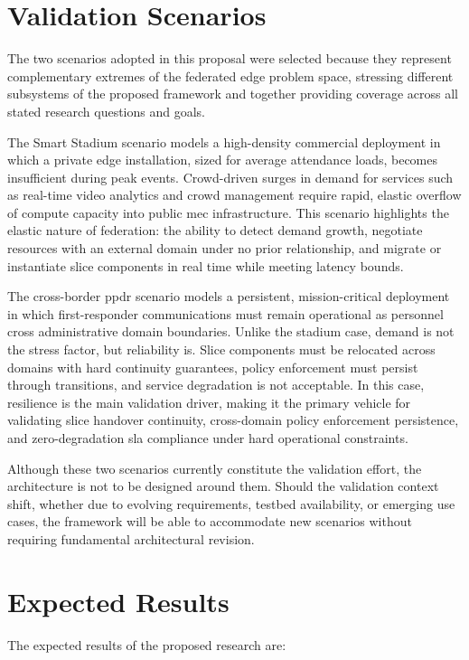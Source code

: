 \section{Validation Scenarios}

The two scenarios adopted in this proposal were selected because they represent complementary extremes of the federated edge problem space, stressing different subsystems of the proposed framework and together providing coverage across all stated research questions and goals.

The Smart Stadium scenario models a high-density commercial deployment in which a private edge installation, sized for average attendance loads, becomes insufficient during peak events. Crowd-driven surges in demand for services such as real-time video analytics and crowd management require rapid, elastic overflow of compute capacity into public \ac{mec} infrastructure. This scenario highlights the elastic nature of federation: the ability to detect demand growth, negotiate resources with an external domain under no prior relationship, and migrate or instantiate slice components in real time while meeting latency bounds.

The cross-border \ac{ppdr} scenario models a persistent, mission-critical deployment in which first-responder communications must remain operational as personnel cross administrative domain boundaries. Unlike the stadium case, demand is not the stress factor, but reliability is. Slice components must be relocated across domains with hard continuity guarantees, policy enforcement must persist through transitions, and service degradation is not acceptable. In this case, resilience is the main validation driver, making it the primary vehicle for validating slice handover continuity, cross-domain policy enforcement persistence, and zero-degradation \ac{sla} compliance under hard operational constraints.

Although these two scenarios currently constitute the validation effort, the architecture is not to be designed around them. Should the validation context shift, whether due to evolving requirements, testbed availability, or emerging use cases, the framework will be able to accommodate new scenarios without requiring fundamental architectural revision.
\section{Expected Results}

The expected results of the proposed research are:


